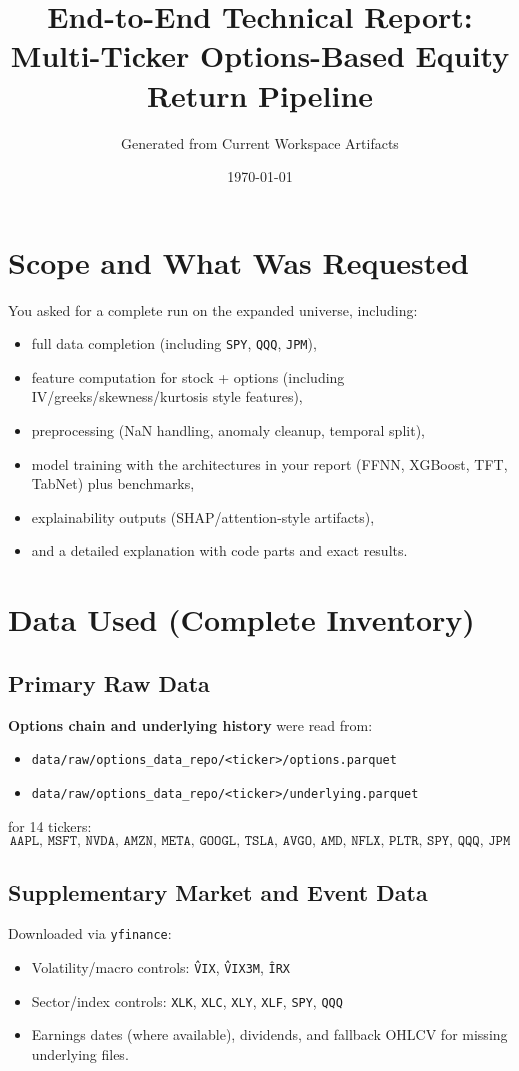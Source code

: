 \documentclass[11pt]{article}
\title{End-to-End Technical Report: Multi-Ticker Options-Based Equity Return Pipeline}
\author{Generated from Current Workspace Artifacts}
\date{\today}
\begin{document}
\maketitle

\section{Scope and What Was Requested}
You asked for a complete run on the expanded universe, including:
\begin{itemize}[leftmargin=1.2em]
  \item full data completion (including \texttt{SPY}, \texttt{QQQ}, \texttt{JPM}),
  \item feature computation for stock + options (including IV/greeks/skewness/kurtosis style features),
  \item preprocessing (NaN handling, anomaly cleanup, temporal split),
  \item model training with the architectures in your report (FFNN, XGBoost, TFT, TabNet) plus benchmarks,
  \item explainability outputs (SHAP/attention-style artifacts),
  \item and a detailed explanation with code parts and exact results.
\end{itemize}

\section{Data Used (Complete Inventory)}

\subsection{Primary Raw Data}
\textbf{Options chain and underlying history} were read from:
\begin{itemize}[leftmargin=1.2em]
  \item \texttt{data/raw/options\_data\_repo/<ticker>/options.parquet}
  \item \texttt{data/raw/options\_data\_repo/<ticker>/underlying.parquet}
\end{itemize}
for 14 tickers:
\[
\texttt{AAPL, MSFT, NVDA, AMZN, META, GOOGL, TSLA, AVGO, AMD, NFLX, PLTR, SPY, QQQ, JPM}
\]

\subsection{Supplementary Market and Event Data}
Downloaded via \texttt{yfinance}:
\begin{itemize}[leftmargin=1.2em]
  \item Volatility/macro controls: \texttt{\^VIX}, \texttt{\^VIX3M}, \texttt{\^IRX}
  \item Sector/index controls: \texttt{XLK}, \texttt{XLC}, \texttt{XLY}, \texttt{XLF}, \texttt{SPY}, \texttt{QQQ}
  \item Earnings dates (where available), dividends, and fallback OHLCV for missing underlying files.
\end{itemize}
\end{document}
